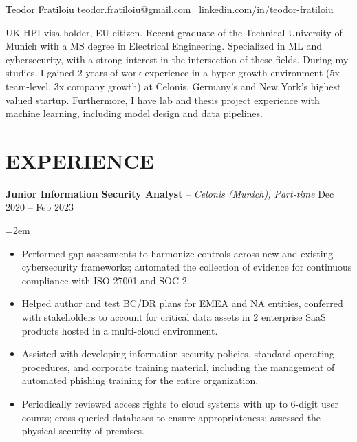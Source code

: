 \documentclass[paper=a4,fontsize=11pt]{scrartcl}
\newcommand{\sepspace}{\vspace*{0.35em}}		%
\newcommand{\NewPart}[1]{\section*{\uppercase{#1}}}
\newcommand{\EducationEntry}[4]{
		\noindent \textit{#1} \hfill      %
		\colorbox{custom_gray}{\color{white}#2} \par  %
		\noindent\hangindent=2em\hangafter=0 \small #3 %
		\normalsize \par}
\newcommand{\WorkEntry}[4]{				  %
		\noindent \textbf{#1} – \textit{#3} \hfill      %
		\colorbox{custom_gray}{\color{white}#2} \par  %
		\noindent\hangindent=2em\hangafter=0 \small #4 %
		\normalsize \par}
\begin{document}
\begin{adjustwidth}{-0.9in}{}
     	\textcolor{black}{
	\parbox[b][2.5cm][c]{21cm}{%
            \huge 
            \centering
            \vspace*{1.5cm}
            \hspace*{3.5cm}Teodor Fratiloiu
            \large
            \newline
            \href{mailto:teodor.fratiloiu@gmail.com}{teodor.fratiloiu@gmail.com} \textbar\
            \href{https://www.linkedin.com/in/teodor-fratiloiu/}{linkedin.com/in/teodor-fratiloiu}
        }
}

\end{adjustwidth}
\vspace{-0.3cm}
UK HPI visa holder, EU citizen. Recent graduate of the Technical University of Munich with a MS degree in Electrical Engineering. Specialized in ML and cybersecurity, with a strong interest in the intersection of these fields. During my studies, I gained 2 years of work experience in a hyper-growth environment (5x team-level, 3x company growth) at Celonis, Germany's and New York’s highest valued startup. Furthermore, I have lab and thesis project experience with machine learning, including model design and data pipelines.
\vspace{-0.5cm}
\NewPart{Experience}{}
\vspace{-0.3cm}
\WorkEntry{Junior Information Security Analyst}{Dec 2020 – Feb 2023}{Celonis (Munich), Part-time}
{
\begin{itemize}
  \item Performed gap assessments to harmonize controls across new and existing cybersecurity frameworks; automated the collection of evidence for continuous compliance with ISO 27001 and SOC 2.
  \item Helped author and test BC/DR plans for EMEA and NA entities, conferred with stakeholders to account for critical data assets in 2 enterprise SaaS products hosted in a multi-cloud environment.
  \item Assisted with developing information security policies, standard operating procedures, and corporate training material, including the management of automated phishing training for the entire organization.
  \item Periodically reviewed access rights to cloud systems with up to 6-digit user counts; cross-queried databases to ensure appropriateness; assessed the physical security of premises.
\end{itemize}
}
\end{document}
